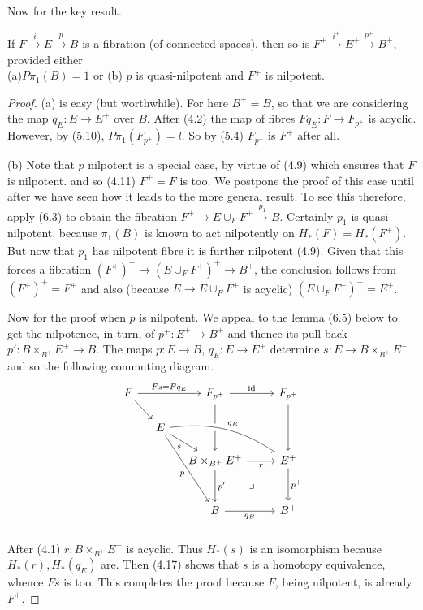 Now for the key result.
\begin{theorem}
If $F\overset{i}{\longrightarrow} E\overset{p}{\longrightarrow} B$ is a fibration (of connected spaces), then so is $F^+\overset{i^+}{\longrightarrow} E^+\overset{p^+}{\longrightarrow} B^+$, provided either\\
(a)$P\pi_1 (B) = 1$ or
(b) $p$ is quasi-nilpotent and $F^+$ is nilpotent.
\end{theorem}
\begin{proof}
 (a) is easy (but worthwhile). For here $B^+ = B$, so that we are considering the map $q_E \colon   E \longrightarrow  E^+$ over $B$. After (4.2) the map of fibres $Fq_E \colon   F \longrightarrow F_{p^+}$ is acyclic. However, by (5.10), $P\pi_1(F_{p^+})=l$. So by (5.4) $F_{p^+}$ is $F^+$ after all. 

(b) Note that $p$ nilpotent is a special case, by virtue of (4.9) which ensures that $F$ is nilpotent. and so (4.11) $F^+ = F$ is too. We postpone the proof of this case until after we have seen how it leads to the more general result. To see this therefore, apply (6.3) to obtain the fibration $F^+ \longrightarrow  E\cup_F F^+ \overset{p_1}{\longrightarrow}  B$. Certainly $p_1$ is quasi-nilpotent, because $\pi_1(B)$ is known to act nilpotently on $H_*(F)= H_*(F^+)$. But now that $p_1$ has nilpotent fibre it is further nilpotent (4.9). Given that this forces a fibration $(F^+)^+\longrightarrow (E\cup_F F^+)^+ \longrightarrow  B^+$, the conclusion follows from $(F^+)^+ = F^+ $ and also (because $E \longrightarrow E\cup_F F^+$ is acyclic) $(E\cup_F F^+)^+ = E^+$.

Now for the proof when $p$ is nilpotent. We appeal to the lemma (6.5) below to get the nilpotence, in turn, of $p^+ \colon   E^+ \longrightarrow B^+$ and thence its pull-back $p' \colon   B\times_{B^+}E^+ \longrightarrow  B$. The maps $p \colon   E\longrightarrow  B$, $q_E\colon   E \longrightarrow E^+$ determine $s \colon   E \longrightarrow  B\times_{B^+}E^+$ and so the following commuting diagram.
\[
\begin{tikzcd}[row sep=scriptsize,column sep=small ]
F \arrow{rr}{Fs=Fq_E} \arrow{rd} &  & F_{p^+} \arrow{rr}{\id} \arrow[dd] & & F_{p^+} \arrow{dd}\\
      &E \arrow[rd,"s"'] \arrow[rddd,"p"']  \arrow[drrr,"q_E", crossing over, bend left=20]&  \\
      & & B\times_{B^+}E^+ \arrow[rr,"r"'] \arrow{dd}{p'} \arrow[ddrr, phantom, "\lrcorner"]&  & E^+ \arrow{dd}{p^+}\\
       \\
      & & B \arrow[rr,"q_B"']& & B^+ \\
\end{tikzcd}
\]
After (4.1) $r\colon   B\times_{B^+}E^+$ is acyclic. Thus $H_*(s)$ is an isomorphism because $H_*(r), H_*(q_E)$ are.
Then (4.17) shows that $s$ is a homotopy equivalence, whence $Fs$ is too. This completes the proof because $F$, being nilpotent, is already $F^+$.
 \end{proof}
